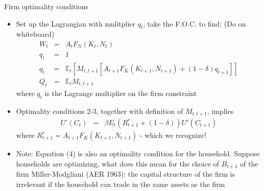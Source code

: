 \documentclass[9pt,xcolor={dvipsnames}]{beamer}
\newcommand{\bit}{\begin{itemize}}
\newcommand{\eit}{\end{itemize}}
\newcommand{\bc}{\color{blue}}
\newcommand{\rc}{\color{red}}
\begin{document}
\begin{frame}{Firm optimality conditions}

\bit
\setlength\itemsep{1.5em} 
\item Set up the Lagrangian with mulitplier $q_t$, take the F.O.C. to find: {\rc (Do on whiteboard)}
\begin{eqnarray}
W_t &=& A_t F_N(K_t, N_t)  \\
q_t &=& 1  \\
q_t &=&  \mathbb E_t \left[M_{t,t+1}\left[A_{t+1}F_K(K_{t+1}, N_{t+1}) + (1-\delta)q_{t+1} \right] \right]  \\
Q_t &=& \mathbb E_t M_{t,t+1} 
\end{eqnarray}
where $q_t$ is the Lagrange multiplier on the firm constraint
 
\item Optimality conditions 2-3, together with definition of $M_{t,t+1}$, implies
\begin{eqnarray}
U'(C_t) &=& \beta E_t(R^{r}_{t+1}+(1-\delta)) U'(C_{t+1}) \nonumber 
\end{eqnarray}
where $R^{r}_{t+1}= A_{t+1}F_K(K_{t+1}, N_{t+1})$ - which we recognize!

\item Note: Equation (4) is also an optimality condition for the household. Suppose households are optimizing, what does this mean for the choice of $B_{t+1}$ of the firm {\bc Miller-Modgliani (AER 1963): the capital structure of the firm is irrelevant if the household can trade in the same assets as the firm}

\eit

\end{frame}
\end{document}
